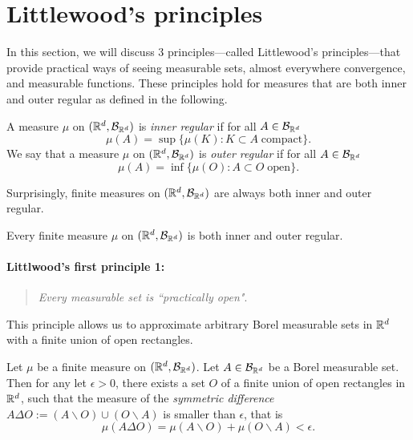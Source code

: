 \section{Littlewood's principles}

In this section, we will discuss 3 principles---called Littlewood's principles---that provide practical ways of seeing measurable sets, almost everywhere convergence, and measurable functions. These principles hold for measures that are both inner and outer regular as defined in the following.

\begin{definition}
A measure $\mu$ on $(\mathbb R^d, \mathcal B_{\mathbb R^d})$ is \emph{inner regular} if for all $A \in \mathcal B_{\mathbb R^d}$ 
\[
	\mu(A) = \sup\bigl\{ \mu(K) : K\subset A\;\text{compact}\bigr\}.
\]
We say that a measure $\mu$ on $(\mathbb R^d, \mathcal B_{\mathbb R^d})$ is \emph{outer regular} if for all $A \in \mathcal B_{\mathbb R^d}$ 
\[
	\mu(A) = \inf \bigl\{ \mu(O): A\subset O\;\text{open}\bigr\}.
\]
\end{definition}

Surprisingly, finite measures on $(\mathbb R^d, \mathcal B_{\mathbb R^d})$ are always both inner and outer regular.

\begin{theorem}\label{th:regularity-measure}
	Every finite measure $\mu$ on $(\mathbb R^d, \mathcal B_{\mathbb R^d})$ is both inner and outer regular.	
\end{theorem}



\paragraph{Littlwood's first principle 1:} 
\begin{quotation}
	\emph{Every measurable set is ``practically open"}.
\end{quotation}

This principle allows us to approximate arbitrary Borel measurable sets in $\mathbb R^d$ with a finite union of open rectangles.

\begin{theorem}
Let $\mu$ be a finite measure on $(\mathbb R^d, \mathcal B_{\mathbb R^d})$.
Let $A \in \mathcal B_{\mathbb R^d}$ be a Borel measurable set. Then for any let $\epsilon > 0$, there exists a set $O$ of a finite union of open rectangles in $\mathbb R^d$, such that the measure of the \emph{symmetric difference} $A \Delta O := (A \backslash O) \cup (O \backslash A)$ is smaller than $\epsilon$, that is
\[
\mu( A \Delta O  ) = \mu( A \backslash O ) + \mu( O \backslash A) < \epsilon.
\]
\end{theorem}

